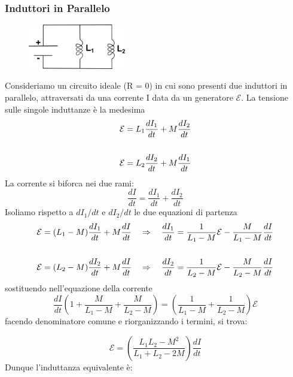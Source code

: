 \subsubsection{Induttori in Parallelo}
	\begin{figure} %
    \centering
    \includegraphics[width=0.38\textwidth]{images/inductance_parallel} %
\end{figure}
Consideriamo un circuito ideale (R = 0) in cui sono presenti due induttori in parallelo, attraversati da una corrente I data da un generatore $\mathcal{E}$.  La tensione sulle singole induttanze \`e la medesima 
\begin{align*}
	\mathcal{E} = L_1 \frac{d I_1}{dt} + M \frac{dI_2}{dt} \\ \rule{0pt}{30pt} 
	\mathcal{E} = L_2 \frac{d I_2}{dt} + M \frac{d I_1}{dt}
\end{align*}
La corrente si biforca nei due rami: 
\begin{equation*}
	\frac{dI}{dt} = \frac{d I_1}{dt} + \frac{dI_2}{dt}
\end{equation*}
Isoliamo rispetto a $dI_1/dt$ e $dI_2/dt$ le due equazioni di partenza
\begin{align*}
	\mathcal{E}  = (L_1 -M) \frac{d I_1}{dt} + M \frac{d I}{dt} \quad \Rightarrow \quad \frac{d I_1}{dt} = \frac{1}{L_1-M} \mathcal{E} - \frac{M}{L_1-M} \frac{d I}{dt} \\ \rule{0pt}{30pt}
	\mathcal{E}  = (L_2 - M) \frac{d I_2}{dt} + M\frac{dI}{dt} \quad \Rightarrow \quad \frac{dI_2}{dt} = \frac{1}{L_2 - M} \mathcal{E} - \frac{M}{L_2 - M} \frac{d I}{dt}
\end{align*}
sostituendo nell'equazione della corrente 
\begin{equation*}
	\frac{dI}{dt} \left( 1 + \frac{M}{L_1 - M} + \frac{M}{L_2 -M}\right) = \left( \frac{1}{L_1 - M} + \frac{1}{L_2-M} \right)\mathcal{E}
\end{equation*}
facendo denominatore comune e riorganizzando i termini, si trova:

\begin{equation*}
	\mathcal{E} = \left( \frac{L_1L_2 - M^2}{L_1 + L_2 - 2M}\right)\frac{dI}{dt}
\end{equation*}
Dunque l'induttanza equivalente \`e:


